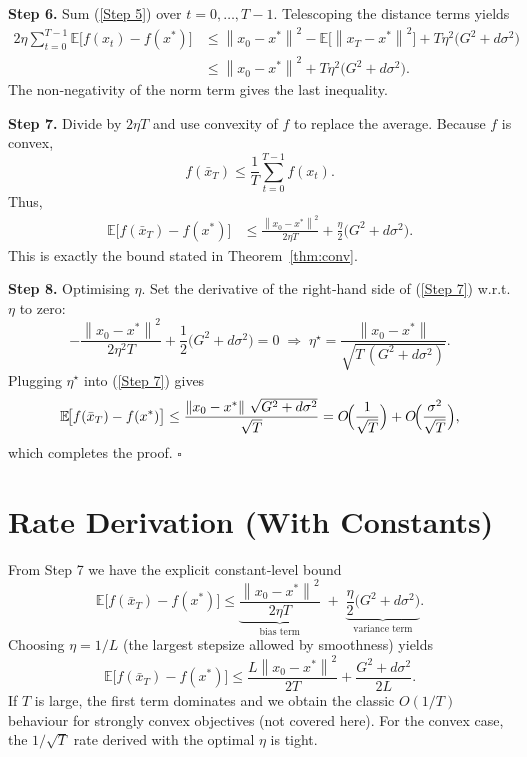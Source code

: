 \documentclass[11pt]{article}
\newcommand{\E}{\mathbb{E}}
\newcommand{\norm}[1]{\left\lVert #1 \right\rVert}
\begin{document}
\noindent\textbf{Step 6.} Sum (\ref{Step 5}) over $t=0,\dots,T-1$.
Telescoping the distance terms yields
\begin{align}
2\eta\sum_{t=0}^{T-1}\E\!\bigl[f(x_{t})-f(x^{*})\bigr]
&\le 
\norm{x_{0}-x^{*}}^{2}
-\E\!\bigl[\norm{x_{T}-x^{*}}^{2}\bigr]
+T\eta^{2}\bigl(G^{2}+d\sigma^{2}\bigr) \nonumber\\
&\le 
\norm{x_{0}-x^{*}}^{2}
+T\eta^{2}\bigl(G^{2}+d\sigma^{2}\bigr). \tag{Step 6}
\end{align}
The non‑negativity of the norm term gives the last inequality.

\noindent\textbf{Step 7.} Divide by $2\eta T$ and use convexity of $f$ to replace the average.
Because $f$ is convex,
\[
f(\bar x_{T})\le \frac{1}{T}\sum_{t=0}^{T-1}f(x_{t}).
\]
Thus,
\begin{align}
\E\!\bigl[f(\bar x_{T})-f(x^{*})\bigr]
&\le 
\frac{\norm{x_{0}-x^{*}}^{2}}{2\eta T}
+\frac{\eta}{2}\bigl(G^{2}+d\sigma^{2}\bigr). \tag{Step 7}
\end{align}
This is exactly the bound stated in Theorem~\ref{thm:conv}.

\noindent\textbf{Step 8.} Optimising $\eta$.  
Set the derivative of the right‑hand side of (\ref{Step 7}) w.r.t. $\eta$ to zero:
\[
-\frac{\norm{x_{0}-x^{*}}^{2}}{2\eta^{2}T}
+\frac{1}{2}\bigl(G^{2}+d\sigma^{2}\bigr)=0
\;\Longrightarrow\;
\eta^{\star}= \frac{\norm{x_{0}-x^{*}}}{\sqrt{T\,(G^{2}+d\sigma^{2})}}.
\]
Plugging $\eta^{\star}$ into (\ref{Step 7}) gives
\[
\E\!\bigl[f(\bar x_{T})-f(x^{*})\bigr]
\le
\frac{\norm{x_{0}-x^{*}}\,\sqrt{G^{2}+d\sigma^{2}}}{\sqrt{T}}
=O\!\Bigl(\frac{1}{\sqrt{T}}\Bigr)
+O\!\Bigl(\frac{\sigma^{2}}{\sqrt{T}}\Bigr),
\]
which completes the proof. \hfill $\square$

\section*{Rate Derivation (With Constants)}
From Step 7 we have the explicit constant‑level bound
\[
\E\!\bigl[f(\bar x_{T})-f(x^{*})\bigr]
\le
\underbrace{\frac{\norm{x_{0}-x^{*}}^{2}}{2\eta T}}_{\text{bias term}}
\;+\;
\underbrace{\frac{\eta}{2}\bigl(G^{2}+d\sigma^{2}\bigr)}_{\text{variance term}}.
\]
Choosing $\eta=1/L$ (the largest stepsize allowed by smoothness) yields
\[
\E\!\bigl[f(\bar x_{T})-f(x^{*})\bigr]
\le
\frac{L\norm{x_{0}-x^{*}}^{2}}{2T}
+\frac{G^{2}+d\sigma^{2}}{2L}.
\]
If $T$ is large, the first term dominates and we obtain the classic $O(1/T)$
behaviour for strongly convex objectives (not covered here).  For the convex case,
the $1/\sqrt{T}$ rate derived with the optimal $\eta$ is tight.
\end{document}
